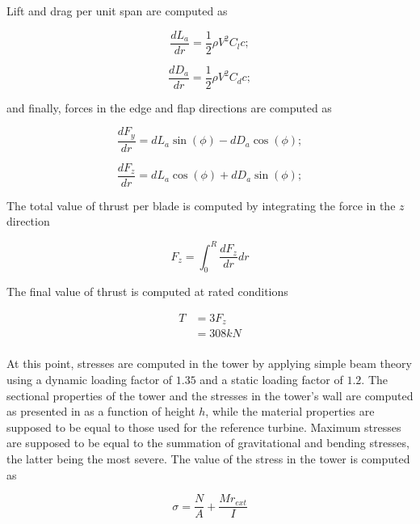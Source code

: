 Lift and drag per unit span are computed as

\begin{equation}
    \frac{dL_a}{dr} = \frac{1}{2} \rho V ^ 2 C_l c;
\end{equation}

\begin{equation}
    \frac{dD_a}{dr}  = \frac{1}{2} \rho V ^ 2 C_d c;
\end{equation}

and finally, forces in the edge and flap directions are computed as

\begin{equation}
    \frac{dF_y}{dr}  = dL_a \sin(\phi) - dD_a \cos(\phi);
\end{equation}

\begin{equation}
    \frac{dF_z}{dr}  = dL_a \cos(\phi) + dD_a \sin(\phi);
\end{equation}

The total value of thrust per blade is computed by integrating the force in the $z$ direction

\begin{equation}
    F_z = \int_{0}^{R} \frac{dF_z}{dr} dr
\end{equation}

The final value of thrust is computed at rated conditions

\begin{align}
    T &= 3 F_z \\
    &= 308 kN \\ \nonumber
\end{align}

At this point, stresses are computed in the tower by applying simple beam theory using a dynamic loading factor of $1.35$ and a static loading factor of $1.2$. The sectional properties of the tower and the stresses in the tower's wall are computed as presented in \cite{Bispl} as a function of height $h$, while the material properties are supposed to be equal to those used for the reference turbine. Maximum stresses are supposed to be equal to the summation of gravitational and bending stresses, the latter being the most severe. The value of the stress in the tower is computed as

\begin{equation}
    \sigma = \frac{N}{A} + \frac{M r_{ext}}{I}
\end{equation}

